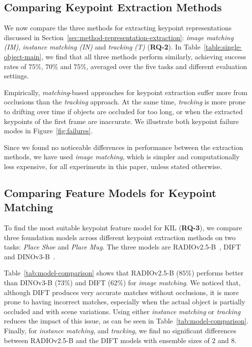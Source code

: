 \documentclass[letterpaper, 10 pt, conference]{ieeeconf}  %
\begin{document}

\subsection{Comparing Keypoint Extraction Methods}
\label{sec:experiments-extraction-comparison}
We now compare the three methods for extracting keypoint representations discussed in Section~\ref{sec:method-representation-extraction}: \textit{image matching (IM)}, \textit{instance matching (IN)} and \textit{tracking (T)} (\textbf{RQ-2}).
In Table~\ref{table:single-object-main}, we find that all three methods perform similarly, achieving success rates of $75\%$, $70\%$ and $75\%$, averaged over the five tasks and different evaluation settings.

Empirically, \textit{matching}-based approaches for keypoint extraction suffer more from occlusions than the \textit{tracking} approach. At the same time, \textit{tracking} is more prone to drifting over time if objects are occluded for too long, or when the extracted keypoints of the first frame are inaccurate. 
We illustrate both keypoint failure modes in Figure~\ref{fig:failures}. 

Since we found no noticeable differences in performance between the extraction methods, we have used \textit{image matching}, which is simpler and computationally less expensive, for all experiments in this paper, unless stated otherwise.



\subsection{Comparing Feature Models for Keypoint Matching}
\label{sec:experiments-model-comparison}

To find the most suitable keypoint feature model for KIL (\textbf{RQ-3}), we compare three foundation models across different keypoint extraction methods on two tasks: \textit{Place Shoe} and \textit{Place Mug}. The three models are RADIOv2.5-B~\cite{heinrich2025radiov2.5}, DIFT~\cite{tang2023dift} and DINOv3-B~\cite{simeoni2025dinov3}.

Table~\ref{tab:model-comparison} shows that RADIOv2.5-B ($85\%$) performs better than DINOv3-B ($73\%$) and DIFT ($62\%$) for \textit{image matching}. We noticed that, although DIFT produces very accurate matches without occlusions, it is more prone to having incorrect matches, especially when the actual object is partially occluded and with scene variations. Using either \textit{instance matching} or \textit{tracking} reduces the impact of this issue, as can be seen in Table~\ref{tab:model-comparison}.
Finally, for \textit{instance matching}, and \textit{tracking}, we find no significant differences between RADIOv2.5-B and the DIFT models with ensemble sizes of $2$ and $8$. 
\end{document}
